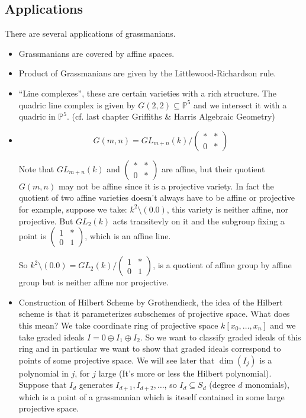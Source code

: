 \subsection{Applications}
There are several applications of grassmanians.\begin{itemize}
    \item Grassmanians are covered by affine spaces.
    \item Product of Grassmanians are given by the Littlewood-Richardson rule. 
    \item ``Line complexes'', these are certain varieties with a rich structure. The quadric line complex is given by $G(2,2)\subseteq \mathbb{P}^5$ and we intersect it with a quadric in $\mathbb{P}^5$. (cf. last chapter Griffiths \& Harris Algebraic Geometry)
    \item \[G(m,n) = GL_{m+n}(k)/\begin{pmatrix}
        \ast & \ast \\
        0 & \ast
    \end{pmatrix}\]

    Note that $GL_{m+n}(k)$ and $\begin{pmatrix}
        \ast & \ast \\
        0 & \ast
    \end{pmatrix}$ are affine, but their quotient $G(m,n)$ may not be affine since it is a projective variety.
        In fact the quotient of two affine varieties doesn't always have to be affine or projective for example, suppose we take: $k^2\setminus (0.0)$, this variety is neither affine, nor projective. But $GL_2(k)$ acts transitevly on it and the subgroup fixing a point is $\begin{pmatrix}
            1 & \ast \\
            0 & 1
        \end{pmatrix}$, which is an affine line.

        So $k^2\setminus (0.0) = GL_2(k)/\begin{pmatrix}
        1 & \ast \\
        0 & 1
        \end{pmatrix}$, is a quotient of affine group by affine group but is neither affine nor projective.  
    \item Construction of Hilbert Scheme by Grothendieck, the idea of the Hilbert scheme is that it parameterizes subschemes of projective space. What does this mean? We take coordinate ring of projective space $k[x_0,\ldots,x_n]$ and we take graded ideals $I = 0\oplus I_1\oplus I_2$. So we want to classify graded ideals of this ring and in particular we want to show that graded ideals correspond to points of some projective space.
          We will see later that $\dim(I_j)$ is a polynomial in $j$, for $j$ large (It's more or less the Hilbert polynomial). Suppose that $I_d$ generates $I_{d+1},I_{d+2},\ldots$, so $I_d\subseteq S_d$ (degree $d$ monomials), which is a point of a grassmanian which is iteself contained in some large projective space. 
\end{itemize} 

